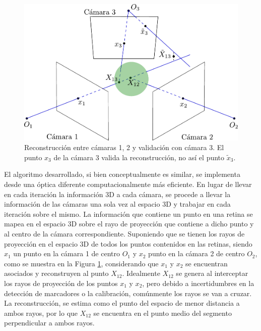 \begin{figure}[ht!]
\centering
\hspace{-1cm}
\captionsetup{justification=centering,margin=1.0cm}
\includegraphics[scale=0.65]{img/Reconstruccion/validacion.pdf}
\caption{Reconstrucción entre cámaras 1, 2 y validación con cámara 3. El punto $x_3$ de la cámara 3 valida la reconstrucción, no así el punto $\tilde{x}_3$.}
\label{img_reconstruccion_validacion}
\end{figure}


El algoritmo desarrollado, si bien conceptualmente es similar, se implementa desde una óptica diferente computacionalmente más eficiente.
En lugar de llevar en cada iteración la información 3D a cada cámara, se procede a llevar la información de las cámaras una sola vez al espacio 3D y trabajar en cada iteración sobre el mismo. La información que contiene un punto en una retina se mapea en el espacio 3D sobre el rayo de proyección que contiene a dicho punto y al centro de la cámara correspondiente. Suponiendo que se tienen los rayos de proyección en el espacio 3D de todos los puntos contenidos en las retinas, siendo $x_1$ un punto en la cámara 1 de centro $O_1$ y $x_2$ punto en la cámara 2 de centro $O_2$, como se muestra en la Figura \ref{img_reconstruccion_validacion}, considerando que $x_1$ y $x_2$ se encuentran asociados y reconstruyen al punto $X_{12}$. Idealmente $X_{12}$ se genera al interceptar los rayos de proyección de los puntos $x_1$ y $x_2$, pero debido a incertidumbres en la detección de marcadores o la calibración, comúnmente los rayos se van a cruzar. La reconstrucción, se estima como el punto del espacio de menor distancia a ambos rayos, por lo que
$X_{12}$ se encuentra en el punto medio del segmento perpendicular a ambos rayos.




